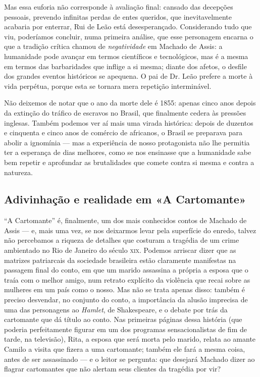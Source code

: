 Mas essa euforia não corresponde à avaliação final: cansado das
decepções pessoais, prevendo infinitas perdas de entes queridos, que
inevitavelmente acabaria por enterrar, Rui de Leão está desesperançado.
Considerando tudo que viu, poderíamos concluir, numa primeira análise,
que esse personagem encarna o que a tradição crítica chamou de
\emph{negatividade} em Machado de Assis: a humanidade pode avançar em
termos científicos e tecnológicos, mas é a mesma em termos das
barbaridades que inflige a si mesma; diante dos afetos, o desfile dos
grandes eventos históricos se apequena. O pai de Dr. Leão prefere a
morte à vida perpétua, porque esta se tornara mera repetição
interminável.

Não deixemos de notar que o ano da morte dele é 1855: apenas cinco anos
depois da extinção do tráfico de escravos no Brasil, que finalmente
cedera às pressões inglesas. Também podemos ver aí mais uma virada
histórica: depois de duzentos e cinquenta e cinco anos de comércio de
africanos, o Brasil se preparava para abolir a ignomínia --- mas a
experiência de nosso protagonista não lhe permitia ter a esperança de
dias melhores, como se nos ensinasse que a humanidade sabe bem repetir e
aprofundar as brutalidades que comete contra si mesma e contra a
natureza.

\subsection{Adivinhação e realidade em «A Cartomante»}

``A Cartomante'' é, finalmente, um dos mais conhecidos contos de Machado
de Assis --- e, mais uma vez, se nos deixarmos levar pela superfície do
enredo, talvez não percebamos a riqueza de detalhes que costuram a
tragédia de um crime ambientado no Rio de Janeiro do século \textsc{xix}. Podemos
arriscar dizer que as matrizes patriarcais da sociedade brasileira estão
claramente manifestas na passagem final do conto, em que um marido
assassina a própria a esposa que o traía com o melhor amigo, num retrato
explícito da violência que recai sobre as mulheres em um país como o
nosso. Mas não se trata apenas disso: também é preciso desvendar, no
conjunto do conto, a importância da alusão imprecisa de uma das
personagens ao \emph{Hamlet}, de Shakespeare, e o debate por trás da
cartomante que dá título ao conto. Nas primeiras páginas dessa história
(que poderia perfeitamente figurar em um dos programas sensacionalistas
de fim de tarde, na televisão), Rita, a esposa que será morta pelo
marido, relata ao amante Camilo a visita que fizera a uma cartomante;
também ele fará a mesma coisa, antes de ser assassinado --- e o leitor se
pergunta: que desejará Machado dizer ao flagrar cartomantes que não
alertam seus clientes da tragédia por vir?

